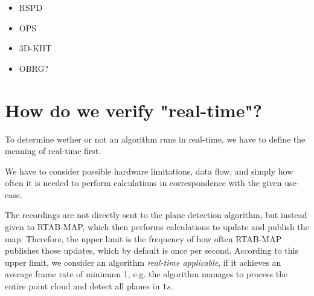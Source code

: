 \documentclass[main.tex]{subfiles}
\begin{document}
\begin{itemize}
    \item RSPD
    \item OPS
    \item 3D-KHT
    \item OBRG?
\end{itemize}


\section{How do we verify "real-time"?}
To determine wether or not an algorithm runs in real-time, we have to define the meaning of real-time first.

We have to consider possible hardware limitations, data flow, and simply
how often it is needed to perform calculations in correspondence with the given use-case.

The recordings are not directly sent to the plane detection algorithm, but instead given to RTAB-MAP, which then performs calculations to update and publish the map.
Therefore, the upper limit is the frequency of how often RTAB-MAP publishes those updates, which by default is once per second.
According to this upper limit, we consider an algorithm \textit{real-time applicable}, if it achieves an average frame
rate of minimum 1, e.g. the algorithm manages to process the entire point cloud and detect all planes in $1s$.

\end{document}
